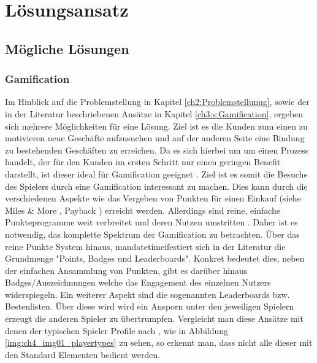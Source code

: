 \chapter{Lösungsansatz}
\label{ch:S4_Lösungsansatz}

\section{Mögliche Lösungen}

\subsection*{Gamification}

Im Hinblick auf die Problemstellung in Kapitel \ref{ch2:Problemstellunug}, sowie der in der Literatur beschriebenen Ansätze in Kapitel \ref{ch3:s:Gamification}, ergeben sich mehrere Möglichkeiten für eine Lösung. Ziel ist es die Kunden zum einen zu motivieren neue Geschäfte aufzusuchen und auf der anderen Seite eine Bindung zu bestehenden Geschäften zu erreichen. Da es sich hierbei um um einen Prozess handelt, der für den Kunden im ersten Schritt nur einen geringen Benefit darstellt, ist dieser ideal für Gamification geeignet \cite{Leigh.2012}. Ziel ist es somit die Besuche des Spielers durch eine Gamification interessant zu machen. Dies kann durch die verschiedenen Aspekte wie das Vergeben von Punkten für einen Einkauf (siehe Miles \& More \cite{Wagner.2005}, Payback \cite{Roesl.2005}) erreicht werden. Allerdings sind reine, einfache Punkteprogramme weit verbreitet und deren Nutzen umstritten \cite{Schmitt.2001}.
Daher ist es notwendig, das komplette Spektrum der Gamification zu betrachten.
Über das reine Punkte System hinaus, mandatetimeifestiert sich in der Literatur die Grundmenge "Points, Badges und Leaderboards".
Konkret bedeutet dies, neben der einfachen Ansammlung von Punkten, gibt es darüber hinaus Badges/Auszeichnungen welche das Engagement des einzelnen Nutzers widerspiegeln. Ein weiterer Aspekt sind die sogenannten Leaderboards bzw. Bestenlisten. Über diese wird wird ein Ansporn unter den jeweiligen Spielern erzeugt die anderen Spieler zu übertrumpfen. Vergleicht man diese Ansätze mit denen der typischen Spieler Profile nach \citep{Bartle.2004}, wie in Abbildung \ref{img:ch4_img01_playertypes} zu sehen, so erkennt man, dass nicht alle dieser mit den Standard Elementen bedient werden.

